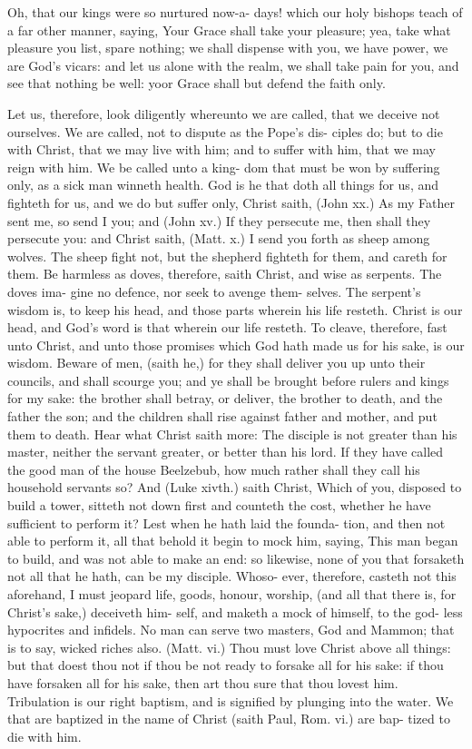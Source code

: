 \documentclass{custom}
\begin{document}
Oh, that our kings were so nurtured now-a- 
days! which our holy bishops teach of a far 
other manner, saying, Your Grace shall take 
your pleasure; yea, take what pleasure you list, 
spare nothing; we shall dispense with you, we 
have power, we are God's vicars: and let us 
alone with the realm, we shall take pain for you, 
and see that nothing be well: yoor Grace shall 
but defend the faith only. 

Let us, therefore, look diligently whereunto 
we are called, that we deceive not ourselves. 
We are called, not to dispute as the Pope's dis- 
ciples do; but to die with Christ, that we may 
live with him; and to suffer with him, that we 
may reign with him. We be called unto a king- 
dom that must be won by suffering only, as a 
sick man winneth health. God is he that doth all 
things for us, and fighteth for us, and we do but 
suffer only, Christ saith, (John xx.) As my Father 
sent me, so send I you; and (John xv.) If they 
persecute me, then shall they persecute you:
and Christ saith, (Matt. x.) I send you forth as 
sheep among wolves. The sheep fight not, but 
the shepherd fighteth for them, and careth for 
them. Be harmless as doves, therefore, saith 
Christ, and wise as serpents. The doves ima- 
gine no defence, nor seek to avenge them- 
selves. The serpent's wisdom is, to keep his 
head, and those parts wherein his life resteth.
Christ is our head, and God's word is that 
wherein our life resteth. To cleave, therefore, 
fast unto Christ, and unto those promises which 
God hath made us for his sake, is our wisdom. 
Beware of men, (saith he,) for they shall deliver 
you up unto their councils, and shall scourge 
you; and ye shall be brought before rulers and 
kings for my sake: the brother shall betray, or 
deliver, the brother to death, and the father the 
son; and the children shall rise against father 
and mother, and put them to death. Hear what 
Christ saith more: The disciple is not greater 
than his master, neither the servant greater, or 
better than his lord. If they have called the 
good man of the house Beelzebub, how much 
rather shall they call his household servants so? 
And (Luke xivth.) saith Christ, Which of you, 
disposed to build a tower, sitteth not down first 
and counteth the cost, whether he have sufficient 
to perform it? Lest when he hath laid the founda- 
tion, and then not able to perform it, all that 
behold it begin to mock him, saying, This man 
began to build, and was not able to make an 
end: so likewise, none of you that forsaketh not 
all that he hath, can be my disciple. Whoso- 
ever, therefore, casteth not this aforehand, I must 
jeopard life, goods, honour, worship, (and all 
that there is, for Christ's sake,) deceiveth him- 
self, and maketh a mock of himself, to the god- 
less hypocrites and infidels. No man can serve 
two masters, God and Mammon; that is to say, 
wicked riches also. (Matt. vi.) Thou must love 
Christ above all things: but that doest thou 
not if thou be not ready to forsake all for his 
sake: if thou have forsaken all for his sake, then 
art thou sure that thou lovest him. Tribulation
is our right baptism, and is signified by plunging 
into the water. We that are baptized in the 
name of Christ (saith Paul, Rom. vi.) are bap-
tized to die with him. 
\end{document}

